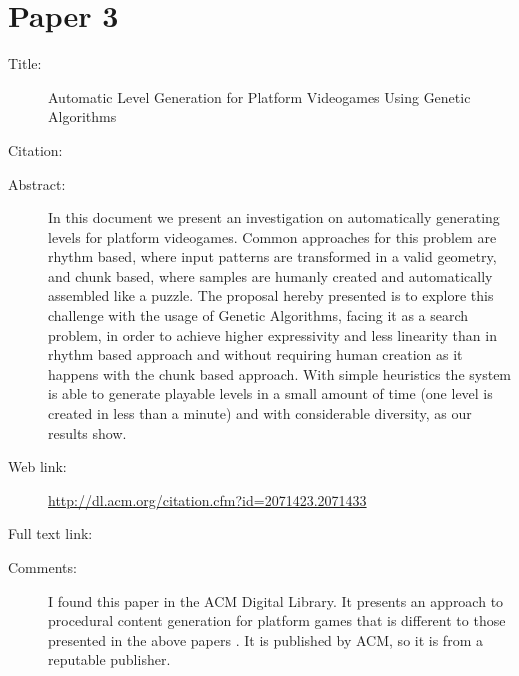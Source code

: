 \documentclass{scrartcl}
\begin{document}
\section*{Paper 3}
\begin{description}
\item[Title:] Automatic Level Generation for Platform Videogames Using Genetic Algorithms
\item[Citation:] \cite{mourato:genetic}
\item[Abstract:] In this document we present an investigation on automatically generating levels for platform videogames. Common approaches for this problem are rhythm based, where input patterns are transformed in a valid geometry, and chunk based, where samples are humanly created and automatically assembled like a puzzle. The proposal hereby presented is to explore this challenge with the usage of Genetic Algorithms, facing it as a search problem, in order to achieve higher expressivity and less linearity than in rhythm based approach and without requiring human creation as it happens with the chunk based approach. With simple heuristics the system is able to generate playable levels in a small amount of time (one level is created in less than a minute) and with considerable diversity, as our results show.
\item[Web link:] \url{http://dl.acm.org/citation.cfm?id=2071423.2071433}
\item[Full text link:] \url{}
\item[Comments:] I found this paper in the ACM Digital Library. It presents an approach to procedural content generation for platform games that is different to those presented in the above papers \cite{smith:launchpad, mawhorter:occupancy}. It is published by ACM, so it is from a reputable publisher.
\end{description}
\end{document}

